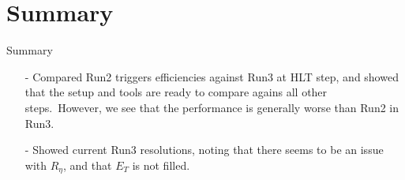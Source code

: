 \documentclass[aspectratio=1610,8pt]{beamer}					%
\begin{document}
\section{Summary}
\begin{frame}{Summary}
    \begin{itemize}
        \item [-]
            Compared Run2 triggers efficiencies against Run3 at HLT step,
            and showed that the setup and tools are ready to compare agains all other steps.\
            However, we see that the performance is generally worse than Run2 in Run3.
        \item [-]
            Showed current Run3 resolutions,
            noting that there seems to be an issue with $R_\eta$,
            and that $E_T$ is not filled.
            
    \end{itemize}
\end{frame}
\end{document}
